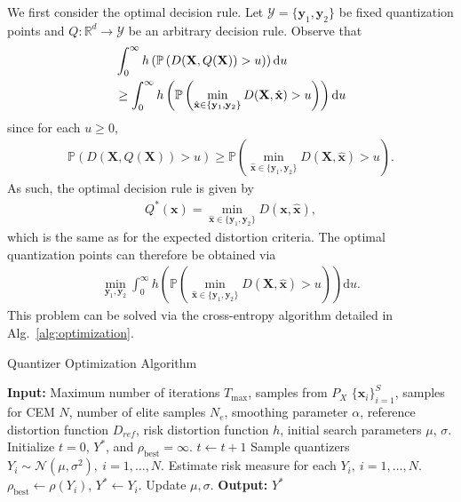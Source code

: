 \documentclass[conference]{IEEEtran}
\begin{document}
We first consider the optimal decision rule. Let $\mathcal{Y} = \{\mathbf{y}_1,\mathbf{y}_2\}$ be fixed quantization points and $Q: \mathbb{R}^d \rightarrow \mathcal{Y}$ be an arbitrary decision rule. Observe that 
\begin{align}
&\int_0^{\infty} h\left(\mathbb{P}\left(D(\mathbf{X},Q(\mathbf{X})) > u\right)\right)\mathrm{d}u\notag\\
&\geq \int_0^{\infty} h\left(\mathbb{P}\left(\min_{\hat{\mathbf{x}} \in \{\mathbf{y}_1,\mathbf{y}_2\}} D(\mathbf{X},\hat{\mathbf{x}}) > u\right)\right)\mathrm{d}u
\end{align}
since for each $u \geq 0$,
\begin{align}
\mathbb{P}\left(D(\mathbf{X},Q(\mathbf{X})) > u\right) \geq \mathbb{P}\left(\min_{\hat{\mathbf{x}} \in \{\mathbf{y}_1,\mathbf{y}_2\}} D(\mathbf{X},\hat{\mathbf{x}}) > u\right).
\end{align} 
As such, the optimal decision rule is given by 
\begin{align}
Q^*(\mathbf{x}) = \min_{\hat{\mathbf{x}} \in \{\mathbf{y}_1,\mathbf{y}_2\}} D(\mathbf{x},\hat{\mathbf{x}}),
\end{align}
which is the same as for the expected distortion criteria. The optimal quantization points can therefore be obtained via 
\begin{align}
\min_{\mathbf{y}_1,\mathbf{y}_2} \int_0^{\infty} h\left(\mathbb{P}\left(\min_{\hat{\mathbf{x}} \in \{\mathbf{y}_1,\mathbf{y}_2\}} D(\mathbf{X},\hat{\mathbf{x}}) > u\right)\right)\mathrm{d}u.
\end{align}
This problem can be solved via the cross-entropy algorithm detailed in Alg.~\ref{alg:optimization}. 

\begin{algorithm}
\caption{Quantizer Optimization Algorithm}\label{alg:optimization}
\begin{algorithmic}[1]
	\STATE \textbf{Input:} Maximum number of iterations $T_{\max}$, samples from $P_X$ $\{\mathbf{x}_i\}_{i=1}^S$, samples for CEM $N$, number of elite samples $N_{e}$, smoothing parameter $\alpha$, reference distortion function $D_{ref}$, risk distortion function $h$, initial search parameters $\mu$, $\sigma$. \STATE Initialize $t = 0$, $Y^*$, and $\rho_{\mathrm{best}} = \infty$. 
	\STATE $t \leftarrow t+1$
	\STATE Sample quantizers $Y_i \sim \mathcal{N}(\mu,\sigma^2),~i = 1,\ldots,N$.
	\STATE Estimate risk measure for each $Y_i,~i = 1,\ldots,N$.
	\STATE $\rho_{\mathrm{best}} \leftarrow \rho(Y_i)$, $Y^* \leftarrow Y_i$.
	\ENDIF
	\STATE Update $\mu,\sigma$.
	\ENDFOR
	\STATE \textbf{Output:} $Y^*$
\end{algorithmic}
\end{algorithm}
\end{document}

